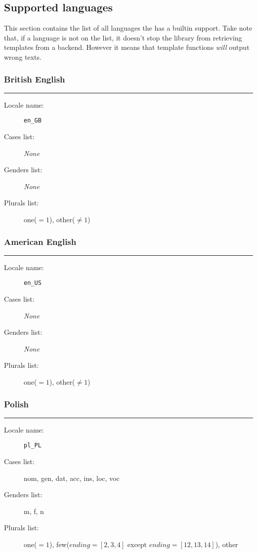 \subsection{Supported languages}\label{supLangs}

This section contains the list of all languages the \mulan{} has a builtin support. 
Take note that, if a language is not on the list, it doesn't stop the library from retrieving templates from a backend.
However it means that template functions \emph{will} output wrong texts. 

\def\none{\textit{None}}
\def\langName#1{\subsubsection*{#1}\hrule\vspace{1em}}

\langName{British English}
\begin{description}
	\item[Locale name:] \texttt{en\_GB}
	\item[Cases list:] \none
	\item[Genders list:] \none
	\item[Plurals list:] one($=1$), other($\not=1$)
\end{description}

\langName{American English}
\begin{description}
	\item[Locale name:] \texttt{en\_US}
	\item[Cases list:] \none
	\item[Genders list:] \none
	\item[Plurals list:] one($=1$), other($\not=1$)
\end{description}

\langName{Polish}
\begin{description}
	\item[Locale name:] \texttt{pl\_PL}
	\item[Cases list:] nom, gen, dat, acc, ins, loc, voc
	\item[Genders list:] m, f, n
	\item[Plurals list:] one($=1$), few($ending=[2,3,4]$ except $ending=[12,13,14]$), other
\end{description}

